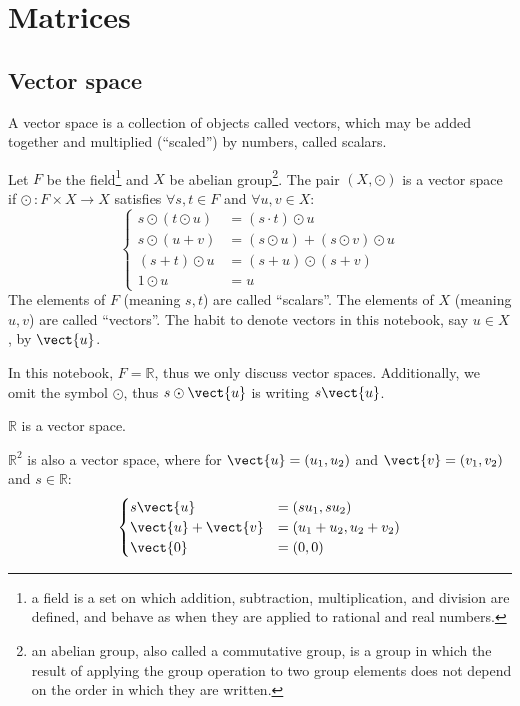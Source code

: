 \chapter{Matrices}
\section{Vector space}
A vector space is a collection of objects called vectors, which may be added together and multiplied (``scaled'') by numbers, called scalars.\par 
Let $F$ be the field\footnote{a field is a set on which addition, subtraction, multiplication, and division are defined, and behave as when they are applied to rational and real numbers.} and $X$ be abelian group\footnote{an abelian group, also called a commutative group, is a group in which the result of applying the group operation to two group elements does not depend on the order in which they are written.}. The pair $\left(X,\odot \right)$ is a vector space if $\odot \, : F \times X \rightarrow X$ satisfies $\forall s,t \in F$ and $\forall u,v \in X$:
\begin{equation*}
\begin{cases}
	s \odot \left( t \odot u \right) &= \left(s \cdot t \right) \odot u \\
	s \odot \left( u+v \right) &= \left(s \odot u \right) + \left(s \odot v \right) \odot u \\
	\left( s+t \right) \odot u &= \left(s + u \right) \odot \left(s + v \right) \\
	1 \odot u &= u
\end{cases}
\end{equation*}
The elements of $F$ (meaning $s,t$) are called ``scalars''. The elements of $X$ (meaning $u,v$) are called ``vectors''. The habit to denote vectors in this notebook, say $u \in X$, by $\vect{u}$.\par 
In this notebook, $F=\mathbb{R}$, thus we only discuss vector spaces. Additionally, we omit the symbol $\odot$, thus $s \odot \vect{u}$ is writing $s\vect{u}$.
\begin{example}
$\mathbb{R}$ is a vector space.
\end{example}

\begin{example}
$\mathbb{R}^2$ is also a vector space, where for $\vect{u}=\left(u_1,u_2\right)$ and $\vect{v}=\left(v_1,v_2\right)$ and $s \in \mathbb{R}$:
	\begin{equation*}
	\begin{cases}
		s\vect{u} &= \left(su_1,su_2\right) \\
		\vect{u}+\vect{v} &= \left(u_1 + u_2 , u_2 + v_2 \right) \\
		\vect{0} &= (0,0)
	\end{cases}
	\end{equation*}
\end{example}

